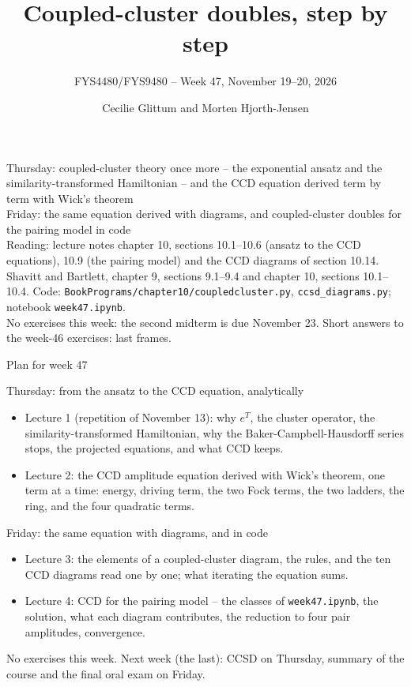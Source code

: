 \documentclass[aspectratio=169,10pt]{beamer}
\title{Coupled-cluster doubles, step by step}
\subtitle{FYS4480/FYS9480 -- Week 47, November 19--20, 2026}
\author{Cecilie Glittum and Morten Hjorth-Jensen}
\institute{Department of Physics,\\
University of Oslo, Norway}
\date{}
\begin{document}
\begin{frame}[plain]
  \vfill
  \begin{center}\small
  Thursday: coupled-cluster theory once more -- the exponential ansatz and the similarity-transformed Hamiltonian -- and the CCD equation derived term by term with Wick's theorem\\
  Friday: the same equation derived with diagrams, and coupled-cluster doubles for the pairing model in code\\[0.55em]
  {\footnotesize Reading: lecture notes chapter 10, sections 10.1--10.6 (ansatz to the CCD equations), 10.9 (the pairing model) and the CCD diagrams of section 10.14. Shavitt and Bartlett, chapter 9, sections 9.1--9.4 and chapter 10, sections 10.1--10.4. Code: \texttt{BookPrograms/chapter10/coupledcluster.py}, \texttt{ccsd\_diagrams.py}; notebook \texttt{week47.ipynb}.\\[0.2em]
  No exercises this week: the second midterm is due November 23. Short answers to the week-46 exercises: last frames.}
  \end{center}
\end{frame}

\begin{frame}[shrink=3]{Plan for week 47}
\small
\begin{block}{Thursday: from the ansatz to the CCD equation, analytically}
\begin{itemize}
\item Lecture 1 (repetition of November 13): why $e^{T}$, the cluster operator, the similarity-transformed Hamiltonian, why the Baker-Campbell-Hausdorff series stops, the projected equations, and what CCD keeps.
\item Lecture 2: the CCD amplitude equation derived with Wick's theorem, one term at a time: energy, driving term, the two Fock terms, the two ladders, the ring, and the four quadratic terms.
\end{itemize}
\end{block}
\begin{block}{Friday: the same equation with diagrams, and in code}
\begin{itemize}
\item Lecture 3: the elements of a coupled-cluster diagram, the rules, and the ten CCD diagrams read one by one; what iterating the equation sums.
\item Lecture 4: CCD for the pairing model -- the classes of \texttt{week47.ipynb}, the solution, what each diagram contributes, the reduction to four pair amplitudes, convergence.
\end{itemize}
\end{block}
\small No exercises this week. Next week (the last): CCSD on Thursday, summary of the course and the final oral exam on Friday.
\end{frame}
\end{document}
